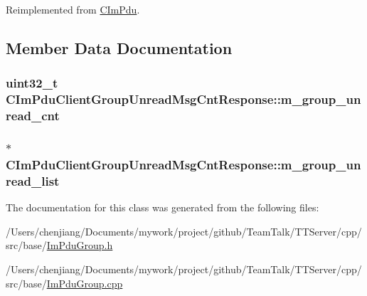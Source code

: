 Reimplemented from \hyperlink{class_c_im_pdu_a887912f445b3e864d33f9e7f2325f1fc}{C\+Im\+Pdu}.



\subsection{Member Data Documentation}
\hypertarget{class_c_im_pdu_client_group_unread_msg_cnt_response_ae700338ff7dc059043f8e1930a95e82f}{}
\subsubsection[{m\+\_\+group\+\_\+unread\+\_\+cnt}]{\setlength{\rightskip}{0pt plus 5cm}uint32\+\_\+t C\+Im\+Pdu\+Client\+Group\+Unread\+Msg\+Cnt\+Response\+::m\+\_\+group\+\_\+unread\+\_\+cnt\hspace{0.3cm}{\ttfamily [private]}}\label{class_c_im_pdu_client_group_unread_msg_cnt_response_ae700338ff7dc059043f8e1930a95e82f}
\hypertarget{class_c_im_pdu_client_group_unread_msg_cnt_response_a8341d2a3c85c390a9f6796c059f5c981}{}
\subsubsection[{m\+\_\+group\+\_\+unread\+\_\+list}]{$\ast$ C\+Im\+Pdu\+Client\+Group\+Unread\+Msg\+Cnt\+Response\+::m\+\_\+group\+\_\+unread\+\_\+list\hspace{0.3cm}{\ttfamily [private]}}\label{class_c_im_pdu_client_group_unread_msg_cnt_response_a8341d2a3c85c390a9f6796c059f5c981}


The documentation for this class was generated from the following files\+:\begin{DoxyCompactItemize}
\item 
/\+Users/chenjiang/\+Documents/mywork/project/github/\+Team\+Talk/\+T\+T\+Server/cpp/src/base/\hyperlink{_im_pdu_group_8h}{Im\+Pdu\+Group.\+h}\item 
/\+Users/chenjiang/\+Documents/mywork/project/github/\+Team\+Talk/\+T\+T\+Server/cpp/src/base/\hyperlink{_im_pdu_group_8cpp}{Im\+Pdu\+Group.\+cpp}\end{DoxyCompactItemize}
